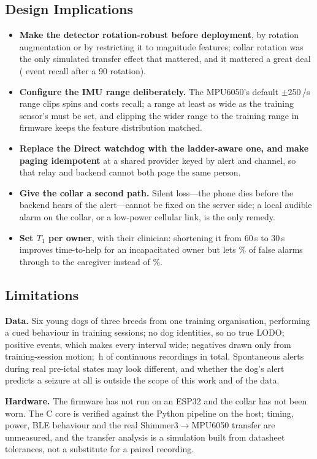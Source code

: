 \subsection{Design Implications}
\begin{itemize}
\item \textbf{Make the detector rotation-robust before deployment}, by rotation augmentation or by restricting it to magnitude features; collar rotation was the only simulated transfer effect that mattered, and it mattered a great deal ( event recall after a 90\textdegree{} rotation).
\item \textbf{Configure the IMU range deliberately.} The MPU6050's default $\pm$250\,\textdegree{}/s range clips spins and costs recall; a range at least as wide as the training sensor's must be set, and clipping the wider range to the training range in firmware keeps the feature distribution matched.
\item \textbf{Replace the Direct watchdog with the ladder-aware one, and make paging idempotent} at a shared provider keyed by alert and channel, so that relay and backend cannot both page the same person.
\item \textbf{Give the collar a second path.} Silent loss---the phone dies before the backend hears of the alert---cannot be fixed on the server side; a local audible alarm on the collar, or a low-power cellular link, is the only remedy.
\item \textbf{Set $T_1$ per owner}, with their clinician: shortening it from 60\,s to 30\,s improves time-to-help for an incapacitated owner but lets \% of false alarms through to the caregiver instead of \%.
\end{itemize}

\subsection{Limitations}
\textbf{Data.} Six young dogs of three breeds from one training organisation, performing a cued behaviour in training sessions; no dog identities, so no true LODO;  positive events, which makes every interval wide; negatives drawn only from training-session motion; \,h of continuous recordings in total. Spontaneous alerts during real pre-ictal states may look different, and whether the dog's alert predicts a seizure at all is outside the scope of this work and of the data.

\textbf{Hardware.} The firmware has not run on an ESP32 and the collar has not been worn. The C core is verified against the Python pipeline on the host; timing, power, BLE behaviour and the real Shimmer3$\rightarrow$MPU6050 transfer are unmeasured, and the transfer analysis is a simulation built from datasheet tolerances, not a substitute for a paired recording.

